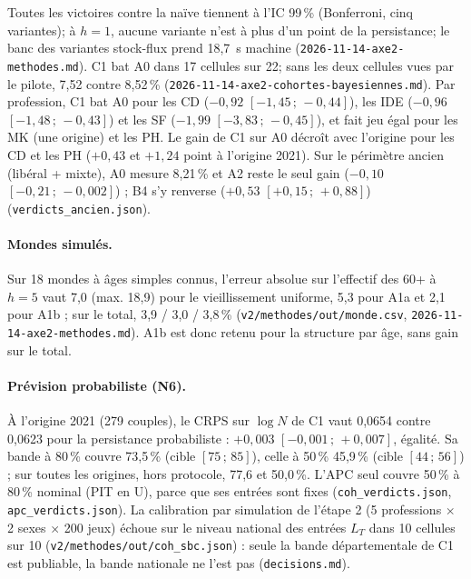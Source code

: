 Toutes les victoires contre la naïve tiennent à l'IC 99\,\% (Bonferroni, cinq variantes)\mesure ; à $h = 1$,
aucune variante n'est à plus d'un point de la persistance\mesure ; le banc des variantes stock-flux prend
18,7\mesure{}~s machine (\texttt{2026-11-14-axe2-methodes.md}). C1 bat A0 dans 17 cellules sur
22\mesure ; sans les deux cellules vues par le pilote, 7,52 contre 8,52\,\%\mesure
(\texttt{2026-11-14-axe2-cohortes-bayesiennes.md}). Par profession, C1 bat A0 pour les CD
($-0{,}92$ $[-1{,}45\,;\,-0{,}44]$\mesure), les IDE ($-0{,}96$ $[-1{,}48\,;\,-0{,}43]$\mesure) et les SF
($-1{,}99$ $[-3{,}83\,;\,-0{,}45]$\mesure), et fait jeu égal pour les MK (une origine) et les PH. Le gain de
C1 sur A0 décroît avec l'origine pour les CD et les PH ($+0{,}43$ et $+1{,}24$\mesure{} point à l'origine
2021). Sur le périmètre ancien (libéral + mixte), A0 mesure 8,21\,\%\mesure{} et A2 reste le seul gain
($-0{,}10$ $[-0{,}21\,;\,-0{,}002]$\mesure) ; B4 s'y renverse ($+0{,}53$ $[+0{,}15\,;\,+0{,}88]$\mesure)
(\texttt{verdicts\_ancien.json}).

\paragraph{Mondes simulés.} Sur 18 mondes à âges simples connus\suppose, l'erreur absolue sur l'effectif
des 60+ à $h = 5$ vaut 7,0\mesure{} (max. 18,9) pour le vieillissement uniforme, 5,3\mesure{} pour A1a et
2,1\mesure{} pour A1b ; sur le total, 3,9 / 3,0 / 3,8\,\%\mesure{} (\texttt{v2/methodes/out/monde.csv},
\texttt{2026-11-14-axe2-methodes.md}). A1b est donc retenu pour la structure par âge, sans gain sur le
total.

\paragraph{Prévision probabiliste (N6).} À l'origine 2021 (279 couples), le CRPS sur $\log N$ de C1 vaut
0,0654\mesure{} contre 0,0623\mesure{} pour la persistance probabiliste : $+0{,}003$
$[-0{,}001\,;\,+0{,}007]$\mesure, égalité. Sa bande à 80\,\% couvre 73,5\,\%\mesure{} (cible
$[75\,;\,85]$), celle à 50\,\% 45,9\,\%\mesure{} (cible $[44\,;\,56]$) ; sur toutes les origines, hors
protocole, 77,6 et 50,0\,\%\mesure. L'APC seul couvre 50\,\%\mesure{} à 80\,\% nominal (PIT en U), parce
que ses entrées sont fixes (\texttt{coh\_verdicts.json}, \texttt{apc\_verdicts.json}). La calibration par
simulation de l'étape 2 (5 professions $\times$ 2 sexes $\times$ 200 jeux) échoue sur le niveau national
des entrées $L_T$ dans 10 cellules sur 10\mesure{} (\texttt{v2/methodes/out/coh\_sbc.json}) : seule la bande
départementale de C1 est publiable, la bande nationale ne l'est pas (\texttt{decisions.md}).

